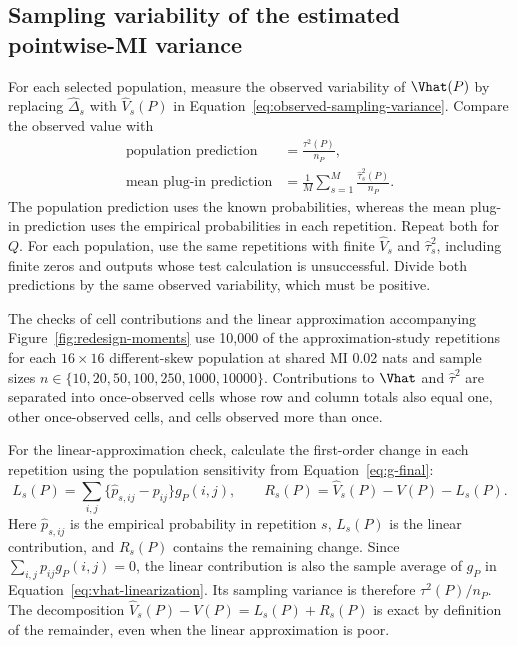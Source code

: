 \subsection{Sampling variability of the estimated pointwise-MI variance}

For each selected population, measure the observed variability of
\(\Vhat(P)\) by replacing \(\widehat\Delta_s\) with
\(\widehat V_s(P)\) in Equation~\eqref{eq:observed-sampling-variance}.
Compare the observed value with
\begin{equation}
\begin{aligned}
 \text{population prediction}&=\frac{\tau^2(P)}{n_P},\\
 \text{mean plug-in prediction}&=
 \frac{1}{M}\sum_{s=1}^{M}\frac{\widehat\tau_s^2(P)}{n_P}.
\end{aligned}
 \label{eq:variance-stability-predictions}
\end{equation}
The population prediction uses the known probabilities, whereas the mean
plug-in prediction uses the empirical probabilities in each repetition.
Repeat both for \(Q\). For each population, use the same repetitions with finite
\(\widehat V_s\) and \(\widehat\tau_s^2\), including finite zeros
and outputs whose test calculation is unsuccessful. Divide both predictions
by the same observed variability, which must be positive.

The checks of cell contributions and the linear approximation accompanying
Figure~\ref{fig:redesign-moments} use 10,000 of the approximation-study
repetitions for each \(16\times16\) different-skew population at shared
MI 0.02 nats and sample sizes
\(n\in\{10,20,50,100,250,1000,10000\}\).
Contributions to \(\Vhat\) and \(\widehat\tau^2\) are separated into
once-observed cells whose row and column totals also equal one, other
once-observed cells, and cells observed more than once.

For the linear-approximation check, calculate the first-order change in
each repetition using the population sensitivity from
Equation~\eqref{eq:g-final}:
\begin{equation}
 L_s(P)=\sum_{i,j}\{\widehat p_{s,ij}-p_{ij}\}g_P(i,j),
 \qquad
 R_s(P)=\widehat V_s(P)-V(P)-L_s(P).
 \label{eq:variance-linear-remainder}
\end{equation}
Here \(\widehat p_{s,ij}\) is the empirical probability in repetition
\(s\), \(L_s(P)\) is the linear contribution, and \(R_s(P)\) contains
the remaining change. Since \(\sum_{i,j}p_{ij}g_P(i,j)=0\), the linear
contribution is also the sample average of \(g_P\) in
Equation~\eqref{eq:vhat-linearization}. Its sampling variance is therefore
\(\tau^2(P)/n_P\). The decomposition
\(\widehat V_s(P)-V(P)=L_s(P)+R_s(P)\) is exact by definition of the
remainder, even when the linear approximation is poor.


